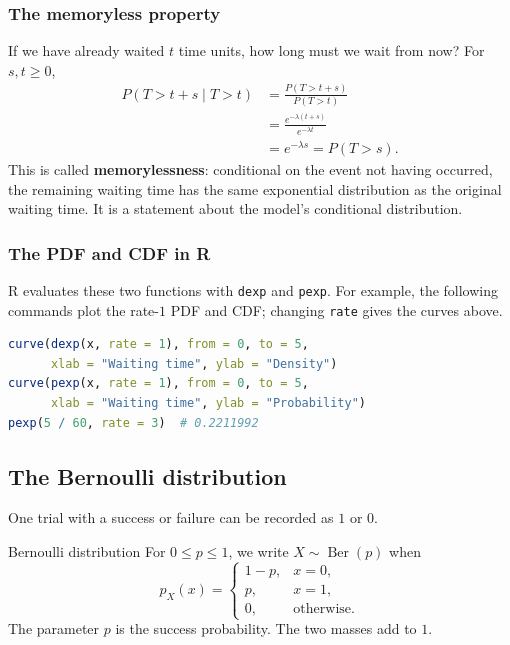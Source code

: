 \documentclass[a4paper,12pt,oneside]{report}
\begin{document}
\subsubsection{The memoryless property}

If we have already waited $t$ time units, how long must we wait
from now? For $s,t\geq0$,
\begin{align*}
  P(T>t+s\mid T>t)
    &=\frac{P(T>t+s)}{P(T>t)}\\
    &=\frac{e^{-\lambda(t+s)}}{e^{-\lambda t}}\\
    &=e^{-\lambda s}=P(T>s).
\end{align*}
This is called \textbf{memorylessness}: conditional on the event
not having occurred, the remaining waiting time has the same
exponential distribution as the original waiting time. It is
a statement about the model's conditional distribution.

\subsubsection{The PDF and CDF in R}

R evaluates these two functions with \texttt{dexp} and
\texttt{pexp}. For example, the following commands plot the
rate-$1$ PDF and CDF; changing \texttt{rate} gives the curves above.
\begin{lstlisting}[language=R]
curve(dexp(x, rate = 1), from = 0, to = 5,
      xlab = "Waiting time", ylab = "Density")
curve(pexp(x, rate = 1), from = 0, to = 5,
      xlab = "Waiting time", ylab = "Probability")
pexp(5 / 60, rate = 3)  # 0.2211992
\end{lstlisting}

\subsection{The Bernoulli distribution}
\label{sec:bernoulli-distribution}

One trial with a success or failure can be recorded as $1$ or $0$.
\begin{frameddefn}{Bernoulli distribution}
For $0\leq p\leq1$, we write $X\sim\operatorname{Ber}(p)$ when
\[
  p_X(x)=
  \begin{cases}
    1-p,&x=0,\\p,&x=1,\\0,&\text{otherwise}.
  \end{cases}
\]
The parameter $p$ is the success probability. The two masses add
to $1$.
\end{frameddefn}
\end{document}
